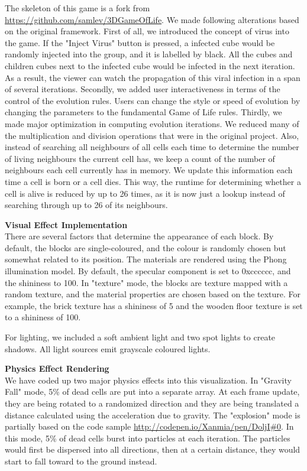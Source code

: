 \documentclass{article}
\begin{document}
The skeleton of this game is a fork from \url{https://github.com/samlev/3DGameOfLife}. We made following alterations based on the original framework. First of all, we introduced the concept of virus into the game. If the "Inject Virus" button is pressed, a infected cube would be randomly injected into the group, and it is labelled by black. All the cubes and children cubes next to the infected cube would be infected in the next iteration. As a result, the viewer can watch the propagation of this viral infection in a span of several iterations. Secondly, we added user interactiveness in terms of the control of the evolution rules. Users can change the style or speed of evolution by changing the parameters to the fundamental Game of Life rules. Thirdly, we made major optimization in computing evolution iterations. We reduced many of the multiplication and division operations that were in the original project. Also, instead of searching all neighbours of all cells each time to determine the number of living neighbours the current cell has, we keep a count of the number of neighbours each cell currently has in memory. We update this information each time a cell is born or a cell dies. This way, the runtime for determining whether a cell is alive is reduced by up to 26 times, as it is now just a lookup instead of searching through up to 26 of its neighbours.

\textbf{Visual Effect Implementation}\\
There are several factors that determine the appearance of each block. By default, the blocks are single-coloured, and the colour is randomly chosen but somewhat related to its position. The materials are rendered using the Phong illumination model. By default, the specular component is set to 0xcccccc, and the shininess to 100. In "texture" mode, the blocks are texture mapped with a random texture, and the material properties are chosen based on the texture. For example, the brick texture has a shininess of 5 and the wooden floor texture is set to a shininess of 100. 

For lighting, we included a soft ambient light and two spot lights to create shadows. All light sources emit grayscale coloured lights.

\textbf{Physics Effect Rendering}\\
We have coded up two major physics effects into this visualization. In "Gravity Fall" mode, 5\% of dead cells are put into a separate array. At each frame update, they are being rotated to a randomized direction and they are being translated a distance calculated using the acceleration due to gravity. The "explosion" mode is partially based on the code sample \url{http://codepen.io/Xanmia/pen/DoljI#0}. In this mode, 5\% of dead cells burst into particles at each iteration. The particles would first be dispersed into all directions, then at a certain distance, they would start to fall toward to the ground instead. 
\end{document}
